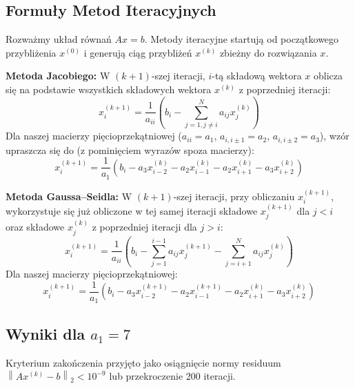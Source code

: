 \documentclass[a4paper, 11pt]{article}
\newcommand{\norm}[1]{\left\lVert#1\right\rVert}
\begin{document}
\subsection{Formuły Metod Iteracyjnych}
Rozważmy układ równań $Ax=b$. Metody iteracyjne startują od początkowego przybliżenia $x^{(0)}$ i generują ciąg przybliżeń $x^{(k)}$ zbieżny do rozwiązania $x$.

\textbf{Metoda Jacobiego:} W $(k+1)$-szej iteracji, $i$-tą składową wektora $x$ oblicza się na podstawie wszystkich składowych wektora $x^{(k)}$ z poprzedniej iteracji:
\begin{equation}
x_i^{(k+1)} = \frac{1}{a_{ii}} \left( b_i - \sum_{j=1, j \neq i}^{N} a_{ij} x_j^{(k)} \right)
\end{equation}
Dla naszej macierzy pięcioprzekątniowej ($a_{ii}=a_1$, $a_{i,i\pm 1}=a_2$, $a_{i,i\pm 2}=a_3$), wzór upraszcza się do (z pominięciem wyrazów spoza macierzy):
\begin{equation}
x_i^{(k+1)} = \frac{1}{a_1} \left( b_i - a_3 x_{i-2}^{(k)} - a_2 x_{i-1}^{(k)} - a_2 x_{i+1}^{(k)} - a_3 x_{i+2}^{(k)} \right)
\label{eq:jacobi_sparse}
\end{equation}

\textbf{Metoda Gaussa–Seidla:} W $(k+1)$-szej iteracji, przy obliczaniu $x_i^{(k+1)}$, wykorzystuje się już obliczone w tej samej iteracji składowe $x_j^{(k+1)}$ dla $j < i$ oraz składowe $x_j^{(k)}$ z poprzedniej iteracji dla $j > i$:
\begin{equation}
x_i^{(k+1)} = \frac{1}{a_{ii}} \left( b_i - \sum_{j=1}^{i-1} a_{ij} x_j^{(k+1)} - \sum_{j=i+1}^{N} a_{ij} x_j^{(k)} \right)
\end{equation}
Dla naszej macierzy pięcioprzekątniowej:
\begin{equation}
x_i^{(k+1)} = \frac{1}{a_1} \left( b_i - a_3 x_{i-2}^{(k+1)} - a_2 x_{i-1}^{(k+1)} - a_2 x_{i+1}^{(k)} - a_3 x_{i+2}^{(k)} \right)
\label{eq:gauss_seidel_sparse}
\end{equation}

\subsection{Wyniki dla $a_1=7$}
Kryterium zakończenia przyjęto jako osiągnięcie normy residuum $\norm{Ax^{(k)} - b}_2 < 10^{-9}$ lub przekroczenie 200 iteracji.
\end{document}
